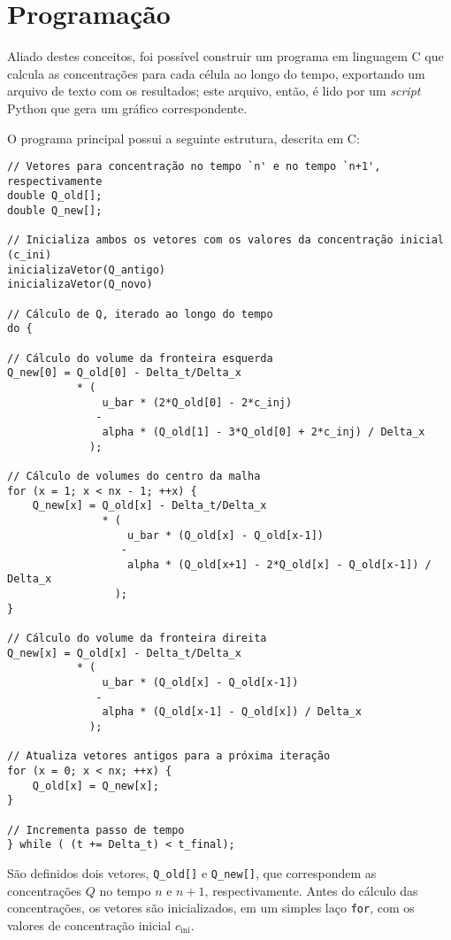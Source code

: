 \section{Programação}
Aliado destes conceitos, foi possível construir um programa em linguagem C que
calcula as concentrações para cada célula ao longo do tempo, exportando um
arquivo de texto com os resultados; este arquivo, então, é lido por um
\textit{script} Python que gera um gráfico correspondente.

O programa principal possui a seguinte estrutura, descrita em C:

\begin{Verbatim}[fontsize=\footnotesize]
// Vetores para concentração no tempo `n' e no tempo `n+1', respectivamente
double Q_old[];
double Q_new[];

// Inicializa ambos os vetores com os valores da concentração inicial (c_ini)
inicializaVetor(Q_antigo)
inicializaVetor(Q_novo)

// Cálculo de Q, iterado ao longo do tempo
do {

// Cálculo do volume da fronteira esquerda
Q_new[0] = Q_old[0] - Delta_t/Delta_x
           * (
               u_bar * (2*Q_old[0] - 2*c_inj)
              -
               alpha * (Q_old[1] - 3*Q_old[0] + 2*c_inj) / Delta_x
             );

// Cálculo de volumes do centro da malha
for (x = 1; x < nx - 1; ++x) {
    Q_new[x] = Q_old[x] - Delta_t/Delta_x
               * (
                   u_bar * (Q_old[x] - Q_old[x-1])
                  -
                   alpha * (Q_old[x+1] - 2*Q_old[x] - Q_old[x-1]) / Delta_x
                 );
}

// Cálculo do volume da fronteira direita
Q_new[x] = Q_old[x] - Delta_t/Delta_x
           * (
               u_bar * (Q_old[x] - Q_old[x-1])
              -
               alpha * (Q_old[x-1] - Q_old[x]) / Delta_x
             );

// Atualiza vetores antigos para a próxima iteração
for (x = 0; x < nx; ++x) {
    Q_old[x] = Q_new[x];
}

// Incrementa passo de tempo
} while ( (t += Delta_t) < t_final);

\end{Verbatim}

São definidos dois vetores, \verb|Q_old[]| e \verb|Q_new[]|, que correspondem
as concentrações $Q$ no tempo $n$ e $n+1$, respectivamente. Antes do cálculo
das concentrações, os vetores são inicializados, em um simples laço \verb|for|,
com os valores de concentração inicial $c_\text{ini}$.

